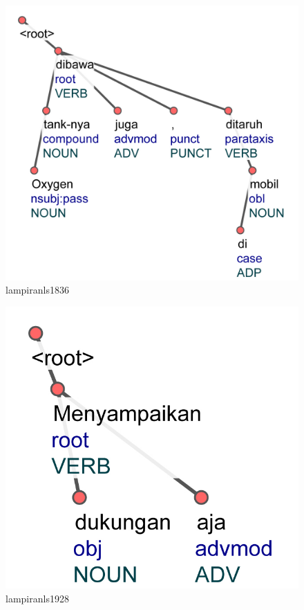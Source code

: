 \begin{figure}
	\centering \includegraphics[width=0.8
	\textwidth] {pics/lampiranls1836.jpg} 
	\caption{lampiranls1836} 
	\label{fig:lampiranls1836} 
\end{figure}

\begin{figure}
	\centering \includegraphics[width=0.8
	\textwidth] {pics/lampiranls1928.jpg} 
	\caption{lampiranls1928} 
	\label{fig:lampiranls1928} 
\end{figure}

